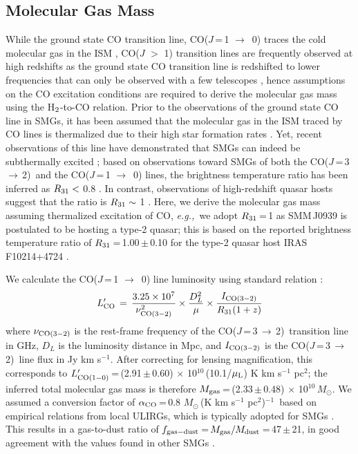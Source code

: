 \documentclass[twocolumn,apj,numberedappendix]{emulateapj}
\newcommand{\Msun}{\mbox{$M_{\odot}$}}
\newcommand{\rarr}{$\rightarrow$}
\newcommand{\CO}{\mbox{CO($J$\,=\,3\,$\rightarrow$\,2) }}
\newcommand{\LpU}{\mbox{K\,\,km\,\,s$^{-1}$\,\,pc$^2$}}
\newcommand{\eg}{{\sl e.g.,~}}
\newcommand{\pmOne}{\mbox{$^{-1}$}}
\begin{document}
\subsection{Molecular Gas Mass}
While the ground state CO transition line, CO($J$\,=\,1 \rarr\ 0) traces the cold molecular gas in the ISM
\citep*[\eg][]{Wilson70a,Downes98a}, CO($J$ $>$ 1) transition lines are frequently observed at high redshifts as the
 ground state CO transition line is redshifted to lower frequencies that can only be observed with a few telescopes 
 \citep{Carilli13a}, 
 hence assumptions on the CO excitation conditions are required to derive the molecular gas mass using the H$_{\rm 2}$-to-CO 
 relation. 
Prior to the observations of the ground state CO line in SMGs, it has been assumed that the molecular gas in the
  ISM traced by CO lines is thermalized due to their high star formation rates \citep[\eg][]{Greve05a, Coppin08a}.
   Yet, recent observations of this line have demonstrated that SMGs can indeed be subthermally excited
   \citep{Harris10a,Riechers11c,Riechers11d,Ivison11a}; based on observations toward SMGs of both the \CO and the CO($J$\,=\,1 \rarr\ 0) lines, the 
   brightness temperature ratio has been inferred as $R_{\rm 31}<$ 0.8 \citep
   {Harris10a,Carilli10a,Swinbank2010a,Riechers11d,Ivison11a,Ivison10d}. In contrast, observations of high-redshift quasar hosts suggest that the ratio 
   is $R_{\rm 31}\sim$ 1 \citep{Riechers06a, Riechers11a, Scott11a}. 
Here, we derive the molecular gas mass 
assuming thermalized excitation of CO, 
\eg we adopt $R_{\rm 31}$\,=\,1 as SMM\,J0939 is 
postulated to be hosting a type-2 quasar; this is based on the reported brightness temperature ratio of $R_{\rm 31}$\,=\,1.00\,$\pm$\,0.10 for the type-2 quasar host IRAS F10214+4724 \citep{Riechers11a}.
\par
We calculate the CO($J$\,=\,1 \rarr\ 0) line luminosity using standard relation 
\citep[\eg][]{Solomon05a,Carilli13a}:
\begin{equation}
L^{\prime}_{\rm CO}\,=\,\frac{3.25\times10^7}{\nu_{\rm CO (3-2)}^2}\times \frac{D_L^2}{\mu} \times
\frac{I_{\rm CO(3-2)}} {R_{\rm 31} (1 + z)}
\end{equation}
where $\nu_{\rm CO (3-2)}$ is the rest-frame frequency of the \CO transition line in GHz, $D_L$ is the luminosity distance in Mpc, and $I_{\rm CO(3-2)}$ is the \CO line flux in Jy\,\,km\,\,s\pmOne. After correcting for lensing magnification, this corresponds to $L^{\prime}_{\rm CO (1-0)}$\,=\,(2.91\,$\pm$\,0.60)\,\,$\times$\,\,10$^{10}$\,(10.1/$\mu_{\rm L}$)\,\,\LpU; the inferred total molecular gas mass is therefore $M_{\rm gas}$\,=\,(2.33\,$\pm$\,0.48)\,\,$\times$\,\,10$^{10}$\,\Msun. We assumed a conversion factor of $\alpha_{\rm CO}$\,=\,0.8\,\,\Msun\,(\LpU)\pmOne\ based on empirical relations from local ULIRGs, which is typically
adopted for SMGs \citep[\eg][]{Tacconi06a,Tacconi08a,Bothwell13a}. 
This results in a gas-to-dust
ratio of $f_{\rm gas-dust}$\,=\,$M_{\rm gas}/M_{\rm dust}$\,=\,47\,$\pm$\,21, in good agreement with the 
values found in other SMGs \citep{Coppin08a,Micha10a,Riechers11c}.
\end{document}
